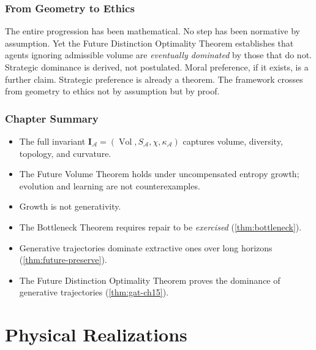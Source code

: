 \documentclass[12pt,twoside,openright]{book}
\newcommand{\adm}{\mathcal{A}}
\newcommand{\Vol}{\operatorname{Vol}}
\newenvironment{chapsummary}{%
  \begin{tcolorbox}[colback=DistBlue!5,colframe=DistBlue,
    title={\faBookOpen\enspace Summary},
    fonttitle=\sffamily\bfseries\color{white},
    attach boxed title to top left={yshift=-2mm,xshift=4mm},
    boxed title style={colback=DistBlue,rounded corners}]
  \begin{itemize}[nosep,leftmargin=*]}{%
  \end{itemize}\end{tcolorbox}}
\newcounter{exercise}[chapter]
\begin{document}
\section{From Geometry to Ethics}

The entire progression has been mathematical. No step has
been normative by assumption. Yet the Future Distinction
Optimality Theorem establishes that agents ignoring
admissible volume are \emph{eventually dominated} by those
that do not. Strategic dominance is derived, not postulated.
Moral preference, if it exists, is a further claim.
Strategic preference is already a theorem. The framework
crosses from geometry to ethics not by assumption but
by proof.

\section*{Chapter Summary}
\begin{chapsummary}
  \item The full invariant
        $\mathbf{I}_\adm=(\Vol,S_\adm,\chi,\kappa_\adm)$
        captures volume, diversity, topology, and curvature.
  \item The Future Volume Theorem holds under uncompensated
        entropy growth; evolution and learning are not
        counterexamples.
  \item Growth is not generativity.
  \item The Bottleneck Theorem requires repair to be
        \emph{exercised} (\cref{thm:bottleneck}).
  \item Generative trajectories dominate extractive ones
        over long horizons (\cref{thm:future-preserve}).
  \item The Future Distinction Optimality Theorem proves
        the dominance of generative trajectories
        (\cref{thm:gat-ch15}).
\end{chapsummary}

\part{Physical Realizations}

\end{document}
